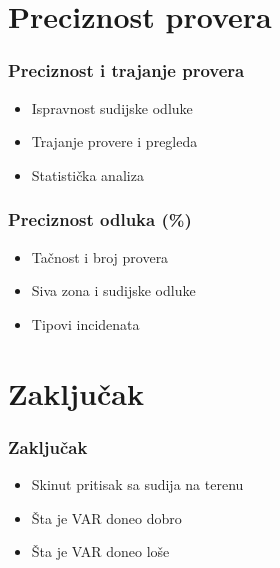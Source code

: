 \documentclass{beamer}
\begin{document}
\section{Preciznost provera}

\begin{frame}
  \frametitle{Preciznost i trajanje provera}
  \begin{itemize}
    \item  Ispravnost sudijske odluke
    \item  Trajanje provere i pregleda
    \item  Statistička analiza
  \end{itemize}
\end{frame}

\begin{frame}
  \frametitle{Preciznost odluka (\%)}
  \begin{itemize}
    \item  Tačnost i broj provera
    \item  Siva zona i sudijske odluke
    \item  Tipovi incidenata
  \end{itemize}
\end{frame}

\section{Zaključak}

\begin{frame}
  \frametitle{Zaključak}
  \begin{itemize}
    \item  Skinut pritisak sa sudija na terenu
    \item  Šta je VAR doneo dobro
    \item  Šta je VAR doneo loše
  \end{itemize}
\end{frame}
\end{document}
